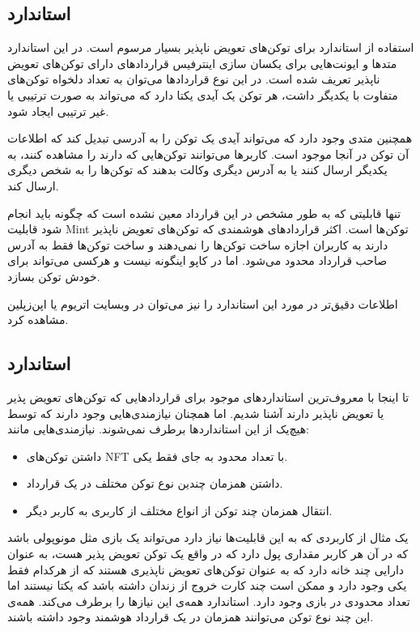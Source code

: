 \subsection{استاندارد }
استفاده از استاندارد
برای توکن‌های تعویض ناپذیر بسیار مرسوم است. در این استاندارد متدها و ایونت‌هایی برای یکسان سازی اینترفیس قراردادهای دارای توکن‌های تعویض ناپذیر تعریف شده است. در این نوع قرارداد‌ها می‌توان به تعداد دلخواه توکن‌های متفاوت با یکدیگر داشت، هر توکن یک آیدی یکتا دارد که می‌تواند به صورت ترتیبی یا غیر ترتیبی ایجاد شود.

همچنین متدی وجود دارد که می‌تواند آیدی یک توکن را به آدرسی تبدیل کند که اطلاعات آن توکن در آنجا موجود است. کاربرها می‌توانند توکن‌هایی که دارند را مشاهده کنند، به یکدیگر ارسال کنند یا به آدرس دیگری وکالت بدهند که توکن‌ها را به شخص دیگری ارسال کند.

تنها قابلیتی که به طور مشخص در این قرارداد معین نشده است که چگونه باید انجام شود قابلیت
\gls{Mint}
توکن‌ها است. اکثر قراردادهای هوشمندی که توکن‌های تعویض ناپذیر دارند به کاربران اجازه ساخت توکن‌ها را نمی‌دهند و ساخت توکن‌ها فقط به آدرس صاحب قرارداد محدود می‌شود. اما در کاپو اینگونه نیست و هرکسی می‌تواند برای خودش توکن بسازد.

اطلاعات دقیق‌تر در مورد این استاندارد را نیز می‌توان در وبسایت
اتریوم
یا
اپن‌زپلین
مشاهده کرد.


\subsection{استاندارد }
تا اینجا با معروف‌ترین استاندارد‌های موجود برای قراردادهایی که توکن‌های تعویض پذیر یا تعویض ناپذیر دارند آشنا شدیم. اما همچنان نیازمندی‌هایی وجود دارند که توسط هیچ‌یک از این استانداردها برطرف نمی‌شوند. نیازمندی‌هایی مانند:
\begin{itemize}
	\item
داشتن توکن‌های NFT با تعداد محدود به جای فقط یکی.
	\item
داشتن همزمان چندین نوع توکن مختلف در یک قرارداد.
	\item
انتقال همزمان چند توکن از انواع مختلف از کاربری به کاربر دیگر.
\end{itemize}

یک مثال از کاربردی که به این قابلیت‌ها نیاز دارد می‌تواند یک بازی مثل مونوپولی باشد که در آن هر کاربر مقداری پول دارد که در واقع یک توکن تعویض پذیر هست، به عنوان دارایی چند خانه دارد که به عنوان توکن‌های تعویض ناپذیری هستند که از هرکدام فقط یکی وجود دارد و ممکن است چند کارت خروج از زندان داشته باشد که یکتا نیستند اما تعداد محدودی در بازی وجود دارد. استاندارد
همه‌ی این نیازها را برطرف می‌کند. همه‌ی این چند نوع توکن می‌توانند همزمان در یک قرارداد هوشمند وجود داشته باشند.

